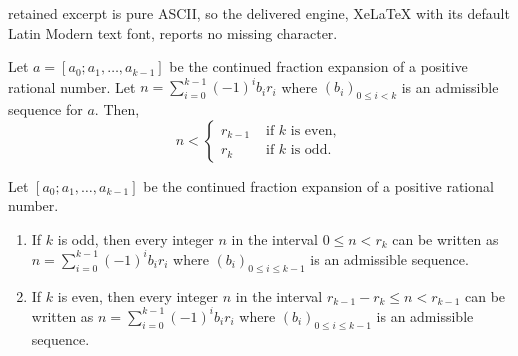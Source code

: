 \documentclass[10pt,a4paper]{amsart}
\begin{document}
retained excerpt is pure ASCII, so the delivered engine, XeLaTeX with its default Latin Modern text font, reports no missing character.
\begin{lemma}\label{lem:upper-bounds-on-the-sum}
    Let $a=[a_0; a_1, \dots, a_{k-1}]$ be the continued fraction expansion
    of a positive rational number.
    Let $n= \sum_{i=0}^{k-1} (-1)^{i}b_{i}r_{i}$
    where $(b_i)_{0\leq i< k}$ is an admissible
    sequence for $a$. Then,
    \[
        n <
        \begin{cases}
            r_{k-1} & \text{ if $k$ is even},\\
            r_k     & \text{ if $k$ is odd}.
        \end{cases}
    \]
\end{lemma}

\begin{lemma}\label{lem:existence-rep-in-interval}
    Let $[a_0; a_1, \dots, a_{k-1}]$ be the continued fraction expansion
    of a positive rational number.
    \begin{enumerate}
        \item If $k$ is odd, then every integer $n$ in the interval
                $0\leq n< r_{k}$
                can be written as
                $
                    n = \sum_{i=0}^{k-1} (-1)^{i}b_{i}r_{i}
                $
                where $(b_i)_{0\leq i\leq k-1}$ is an admissible sequence.
        \item If $k$ is even, then every integer $n$ in the interval
                $r_{k-1}-r_{k}\leq n< r_{k-1}$
                can be written as
                $
                    n = \sum_{i=0}^{k-1} (-1)^{i}b_{i}r_{i}
                $
                where $(b_i)_{0\leq i\leq k-1}$ is an admissible sequence.
    \end{enumerate}
\end{lemma}
\end{document}
